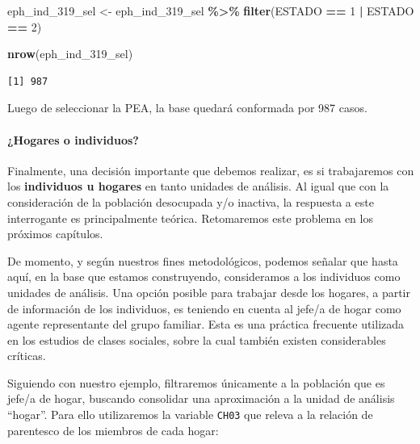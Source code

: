\documentclass[
]{article}
\newenvironment{Shaded}{\begin{snugshade}}{\end{snugshade}}
\newcommand{\DecValTok}[1]{\textcolor[rgb]{0.00,0.00,0.81}{#1}}
\newcommand{\FunctionTok}[1]{\textcolor[rgb]{0.13,0.29,0.53}{\textbf{#1}}}
\newcommand{\NormalTok}[1]{#1}
\newcommand{\OtherTok}[1]{\textcolor[rgb]{0.56,0.35,0.01}{#1}}
\newcommand{\SpecialCharTok}[1]{\textcolor[rgb]{0.81,0.36,0.00}{\textbf{#1}}}
\begin{document}
\begin{Shaded}
\begin{Highlighting}[]
\NormalTok{eph\_ind\_319\_sel }\OtherTok{\textless{}{-}}\NormalTok{ eph\_ind\_319\_sel }\SpecialCharTok{\%\textgreater{}\%}
    \FunctionTok{filter}\NormalTok{(ESTADO }\SpecialCharTok{==} \DecValTok{1} \SpecialCharTok{|}\NormalTok{ ESTADO }\SpecialCharTok{==} \DecValTok{2}\NormalTok{)}

\FunctionTok{nrow}\NormalTok{(eph\_ind\_319\_sel)}
\end{Highlighting}
\end{Shaded}

\begin{verbatim}
[1] 987
\end{verbatim}

Luego de seleccionar la PEA, la base quedará conformada por 987 casos.

\hypertarget{hogares-o-individuos}{%
\paragraph{¿Hogares o individuos?}\label{hogares-o-individuos}}

Finalmente, una decisión importante que debemos realizar, es si trabajaremos con los \textbf{individuos u hogares} en tanto unidades de análisis. Al igual que con la consideración de la población desocupada y/o inactiva, la respuesta a este interrogante es principalmente teórica. Retomaremos este problema en los próximos capítulos.

De momento, y según nuestros fines metodológicos, podemos señalar que hasta aquí, en la base que estamos construyendo, consideramos a los individuos como unidades de análisis. Una opción posible para trabajar desde los hogares, a partir de información de los individuos, es teniendo en cuenta al jefe/a de hogar como agente representante del grupo familiar. Esta es una práctica frecuente utilizada en los estudios de clases sociales, sobre la cual también existen considerables críticas.

Siguiendo con nuestro ejemplo, filtraremos únicamente a la población que es jefe/a de hogar, buscando consolidar una aproximación a la unidad de análisis ``hogar''. Para ello utilizaremos la variable \texttt{CH03} que releva a la relación de parentesco de los miembros de cada hogar:

\begin{Shaded}
\end{Shaded}
\end{document}
